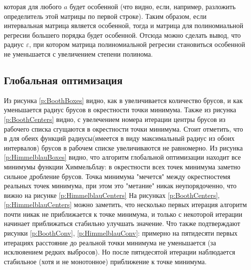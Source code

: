 \documentclass[a4paper,12pt]{article}
\begin{document}
    которая для любого $ a $ будет особенной (что видно, если, например, разложить определитель этой матрицы по первой строке).
    Таким образом, если интервальная матрица является особенной, тогда и матрица для полиномиальной регресии большего порядка будет особенной.
    Отсюда можно сделать вывод, что радиус $ \varepsilon $, при котором матрица полиномиальной регресии становиться особенной не уменьшается с увеличением степени полинома.

    \subsection{Глобальная оптимизация}
    Из рисунка \ref{p:BoothBoxes} видно, как в увеличивается количество брусов, и как уменьшается радиус брусов в окрестности точки минимума.
    Также из рисунка \ref{p:BoothCenters} видно, с увелечением номера итерации центры брусов из рабочего списка сгущаются в окрестности точки минимума.
    Стоит отметить, что в для обеих функций радиусы(имеется в виду максимальный радиус из обоих интервалов) брусов в рабочем списке увеличиваются не равномерно.
    Из рисунка \ref{p:HimmelblauBoxes} видно, что алгоритм глобальной оптимизации находит все минимумы функции Химмельблау: в окрестности всех точек минимума заметно сильное дробление брусов.
    Точка минимума "мечется" между окрестностемя реальных точек минимума, при этом это "метание" никак неупорядоченно, что вижно на рисунке \ref{p:HimmelblauCenters}
    На рисунках \ref{p:BoothCenters}, \ref{p:HimmelblauCenters} можно заметить, что несколько первых итерация алгоритм почти никак не приближается к точке минимума, и только с некоторой итерации начинает приближаться стабильно улучшать значение.
    Что также подтверждают рисунки \ref{p:BoothConv}, \ref{p:HimmelblauConv}: примерно на пятидесяти первых итерациях расстояние до реальной точки минимума не уменьшается (за исклюяением редких выбросов). 
    Но после пятидесятой итерации наблюдается стабильное (хотя и не монотонное) приближение к точке минимума.
\end{document}

